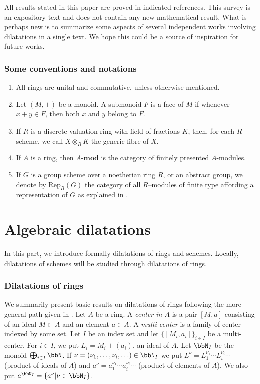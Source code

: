 \documentclass[10pt]{alggeom}
\theoremstyle{definition}
\numberwithin{equation}{section}
\begin{document}
 All results stated in this paper are proved in indicated references. 
This survey is an expository text and does not contain any new mathematical result. What is perhaps new is to summarize some aspects of several independent works involving dilatations in a single text. We hope this could be a source of inspiration for future works.


\section*{Some conventions and notations}

\begin{enumerate}[(1)]
\item All rings are unital and commutative, unless otherwise mentioned. 
\item Let   $(M,+)$ be a monoid. A submonoid  $F$ is a face of $M$ if whenever $x+y\in F$, then both $x$ and $y$ belong to $F$. 
\item If $R$ is a discrete valuation ring with field of fractions $K$, then, for each $R$-scheme, we call $X\otimes_R K$ the generic fibre of $X$. 
\item If $A$ is a ring, then $A\text{-}\mathbf{mod}$ is the category of finitely presented $A$-modules. 
\item If $G$ is a group scheme over a noetherian ring $R$, or an abstract group,  we denote by  $\mathrm {Rep}_R(G)$ the category of all $R$--modules of finite type affording a representation of $G$ as explained in \cite{jantzen03}.
\end{enumerate}



\part{Algebraic dilatations}

In this part, we introduce formally dilatations of rings and schemes. Locally, dilatations of schemes will be studied through dilatations of rings.



\section{Dilatations of rings}\label{09.05.2023--1} 
 We summarily  present basic results on dilatations of rings following the more general path given in \cite{Ma23d}. 
Let $A$ be a  ring. A {\it center in $A$} is a pair $[M,a]$ consisting of an ideal $M\subset A$ and an element $a\in A$. A {\it multi-center} is a family of center indexed by some set. Let $I$ be an index set and let  $\{[M_i , a_i] \}_{i \in I}$ be a multi-center. For $i \in I$, we put $L_i = M_i +(a_i)$, an ideal of $A$. Let $\bbN _I $ be the monoid $\bigoplus _{i \in I} \bbN $. If $\nu = (\nu_1 , \ldots , \nu_i, \ldots ) \in \bbN _I $ we put $L^{\nu}= L_1 ^{\nu_1} \cdots L_i ^{\nu _i} \cdots  $ (product of ideals of $A$) and $a^{\nu}= a_1^{\nu_1 } \cdots a_i ^{\nu _i} \cdots$ (product of elements of $A$). We also put $a^{\bbN _I} = \{ a^\nu | \nu \in \bbN _I \}$. 
\end{document}
